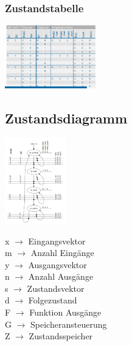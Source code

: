 \documentclass[10pt]{article}
\begin{document}
\begin{multicols}{2}
\subsubsection{Zustandstabelle}
\includegraphics[width=0.3\textwidth]{Zustandstabelle.PNG}
\columnbreak
\subsection{Zustandsdiagramm}
\includegraphics[width=0.2\textwidth,angle=90]{Zustandsdiagramm.PNG}
\end{multicols}
\begin{multicols}{3}
    x $\rightarrow$ Eingangsvektor \\
    m $\rightarrow$ Anzahl Eingänge\\
    y $\rightarrow$ Ausgangsvektor \\
    n $\rightarrow$ Anzahl Ausgänge \\
    s $\rightarrow$ Zustandsvektor\\
    d $\rightarrow$ Folgezustand\\
    F $\rightarrow$ Funktion Ausgänge \\
    G $\rightarrow$ Speicheransteuerung \\
    Z $\rightarrow$ Zustandsspeicher
\end{multicols}
\end{document}
